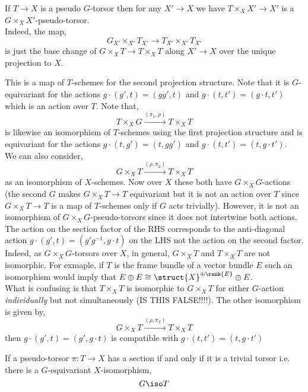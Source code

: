 \documentclass[12pt]{article}
\begin{document}
\begin{rmk}
If $T \to X$ is a pseudo $G$-torsor then for any $X' \to X$ we have $T \times_X X' \to X'$ is a $G \times_X X'$-pseudo-torsor.
\bigskip\\
Indeed, the map,
\[ G_{X'} \times_{X'} T_{X'} \to T_{X'} \times_{X'} T_{X'} \]
is just the base change of $G \times_X T \to T \times_X T$ along $X' \to X$ over the unique projection to $X$. 
\end{rmk}

\begin{rmk}
This is a map of $T$-schemes for the second projection structure. Note that it is $G$-equivariant for the actions $g \cdot (g', t) = (g g', t)$ and $g \cdot (t, t') = (g \cdot t, t')$ which is an action over $T$. Note that,
\[ T \times_X G \xrightarrow{(\pi_1, \rho)} T \times_X T \]
is likewise an isomorphism of $T$-schemes using the first projection structure and is equivariant for the actions $g \cdot (t, g') = (t, g g')$ and $g \cdot (t, t') = (t, g \cdot t')$.
\bigskip\\
We can also consider,
\[ G \times_X T \xrightarrow{(\rho, \pi_2)} T \times_X T \]
as an isomorphism of $X$-schemes. Now over $X$ these both have $G \times_X G$-actions (the second $G$ makes $G \times_X T \to T$ equivariant but it is not an action over $T$ since $G \times_X T \to T$ is a map of $T$-schemes only if $G$ acts trivially). However, it is not an isomorphism of $G \times_X G$-pseudo-torsors since it does not intertwine both actions. The action on the section factor of the RHS corresponds to the anti-diagonal action $g \cdot (g', t) = (g' g^{-1}, g \cdot t)$ on the LHS not the action on the second factor. Indeed, as $G \times_X G$-torsors over $X$, in general, $G \times_X T$ and $T \times_X T$ are not isomorphic. For exmaple, if $T$ is the frame bundle of a vector bundle $E$ such an isomorphism would imply that $E \oplus E \cong \struct{X}^{\oplus \rank{E}} \oplus E$.
\bigskip\\
What is confusing is that $T \times_X T$ is isomorphic to $G \times_X T$ for either $G$-action \textit{individually} but not simultaneously (IS THIS FALSE!!!!). The other isomorphism is given by,
\[ G \times_X T \xrightarrow{(\rho, \pi_2)} T \times_X T \]
then $g \cdot (g', t) = (g', g \cdot t)$ is compatible with $g \cdot (t, t') = (t, g \cdot t')$
\end{rmk}

\begin{prop}
If a pseudo-torsor $\pi : T \to X$ has a section if and only if it is a trivial torsor i.e. there is a $G$-equivariant $X$-isomorphism,
\[ G \iso T \]
\end{prop}
\end{document}
